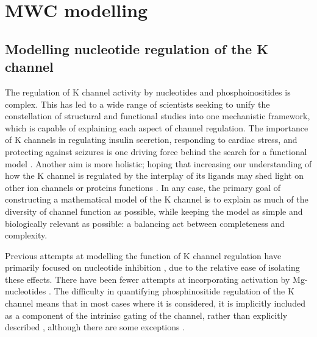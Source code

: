 \chapter{\label{ch:4}MWC modelling} 

\graphicspath{{figures/ch4/}}

\minitoc

\section{Modelling nucleotide regulation of the K\ATP{} channel}

The regulation of K\ATP{} channel activity by nucleotides and phosphoinositides is complex.
This has led to a wide range of scientists seeking to unify the constellation of structural and functional studies into one mechanistic framework, which is capable of explaining each aspect of channel regulation.
The importance of K\ATP{} channels in regulating insulin secretion, responding to cardiac stress, and protecting against seizures is one driving force behind the search for a functional model \cite{proks_modeling_2009}.
Another aim is more holistic; hoping that increasing our understanding of how the K\ATP{} channel is regulated by the interplay of its ligands may shed light on other ion channels or proteins functions \cite{garfinkel_alan_modeling_2017}.
In any case, the primary goal of constructing a mathematical model of the K\ATP{} channel is to explain as much of the diversity of channel function as possible, while keeping the model as simple and biologically relevant as possible: a balancing act between completeness and complexity.

Previous attempts at modelling the function of K\ATP{} channel regulation have primarily focused on nucleotide inhibition \cite{trapp_molecular_1998, enkvetchakul_kinetic_2000, markworth_atp4-_2000, ribalet_regulation_2000, enkvetchakul_atp_2001-1, drain_concerted_2004, proks_gating_2005, li_ligand-dependent_2005, ribalet_atp-sensitive_2006-1, craig_how_2008-1}, due to the relative ease of isolating these effects.
There have been fewer attempts at incorporating activation by Mg-nucleotides \cite{ribalet_regulation_2000, proks_activation_2010-1, vedovato_nucleotide-binding_2015}.
The difficulty in quantifying phosphinositide regulation of the K\ATP{} channel means that in most cases where it is considered, it is implicitly included as a component of the intrinisc gating of the channel, rather than explicitly described \cite{baukrowitz_pip2_1998, fan_phosphoinositides_1999, enkvetchakul_kinetic_2000}, although there are some exceptions \cite{ribalet_regulation_2000, enkvetchakul_atp_2001-1, enkvetchakul_gating_2003}.

